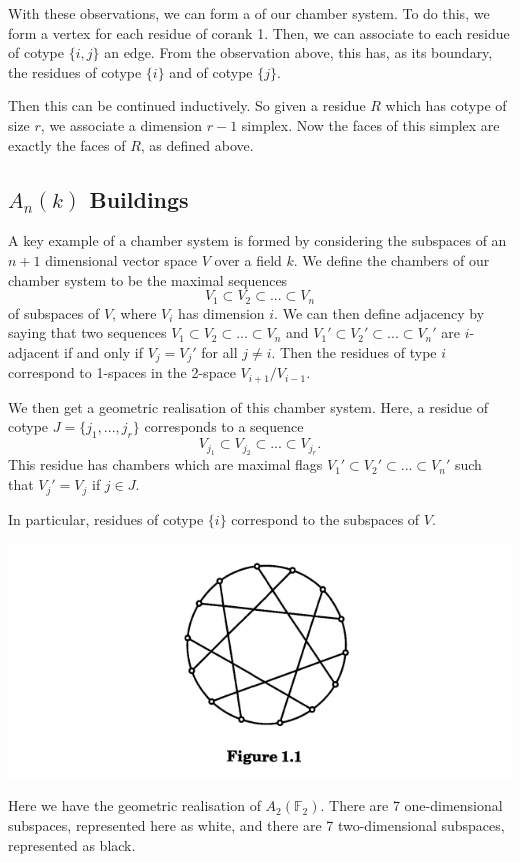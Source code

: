 \documentclass[11pt]{article}
\begin{document}
With these observations, we can form a  of our chamber system. To do this, we form a vertex for each residue of corank 1. Then, we can associate to each residue of cotype $\{i,j\}$ an edge. From the observation above, this has, as its boundary, the residues of cotype $\{i\}$ and of cotype $\{j\}$. 

Then this can be continued inductively. So given a residue $R$ which has cotype of size $r$, we associate a dimension $r-1$ simplex. Now the faces of this simplex are exactly the faces of $R$, as defined above. 

\subsection{$A_n(k)$ Buildings}

A key example of a chamber system is formed by considering the subspaces of an $n+1$ dimensional vector space $V$ over a field $k$. We define the chambers of our chamber system to be the maximal sequences \[V_1\subset V_2\subset ...\subset V_n\] of subspaces of $V$, where $V_i$ has dimension $i$. We can then define adjacency by saying that two sequences $V_1\subset V_2\subset ...\subset V_n$ and $V_1'\subset V_2'\subset ...\subset V_n'$ are $i$-adjacent if and only if $V_j=V_j'$ for all $j\neq i$. Then the residues of type $i$ correspond to 1-spaces in the 2-space $V_{i+1}/V_{i-1}$. 

We then get a geometric realisation of this chamber system. Here, a residue of cotype $J=\{j_1,...,j_r\}$ corresponds to a sequence \[V_{j_1}\subset V_{j_2}\subset ...\subset V_{j_r}.\] This residue has chambers which are maximal flags $V_1'\subset V_2'\subset ...\subset V_n'$ such that $V_j'=V_j$ if $j\in J$. 

In particular, residues of cotype $\{i\}$ correspond to the subspaces of $V$. 

\begin{center}
    

\includegraphics[scale=0.7]{Screenshot 2023-03-09 144457.png}\\
\end{center}
\begin{example}
    Here we have the geometric realisation of $A_2(\mathbb{F}_2)$. There are 7 one-dimensional subspaces, represented here as white, and there are 7 two-dimensional subspaces, represented as black.
\end{example}
\end{document}
